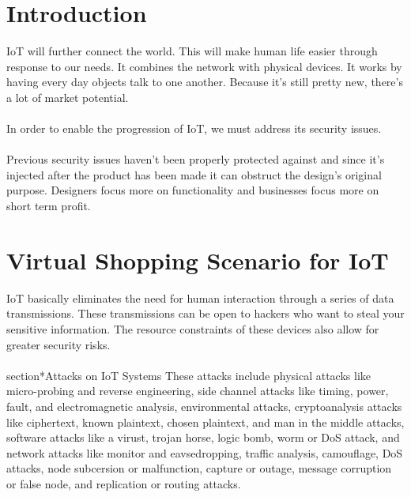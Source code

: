 \documentclass{article}
\begin{document}
\section*{Introduction}
IoT will further connect the world. This will make human life easier through response to our needs. It combines the network with physical devices. It works by having every day objects talk to one another. Because it's still pretty new, there's a lot of market potential.
\\
\\ In order to enable the progression of IoT, we must address its security issues.
\\
\\ Previous security issues haven't been properly protected against and since it's injected after the product has been made it can obstruct the design's original purpose. Designers focus more on functionality and businesses focus more on short term profit.

\section*{Virtual Shopping Scenario for IoT}
IoT basically eliminates the need for human interaction through a series of data transmissions. These transmissions can be open to hackers who want to steal your sensitive information. The resource constraints of these devices also allow for greater security risks. 
\\
\\ section*{Attacks on IoT Systems}
These attacks include physical attacks like micro-probing and reverse engineering, side channel attacks like timing, power, fault, and electromagnetic analysis, environmental attacks, cryptoanalysis attacks like ciphertext, known plaintext, chosen plaintext, and man in the middle attacks, software attacks like a virust, trojan horse, logic bomb, worm or DoS attack, and network attacks like monitor and eavsedropping, traffic analysis, camouflage, DoS attacks, node subcersion or malfunction, capture or outage, message corruption or false node, and replication or routing attacks.
\end{document}
